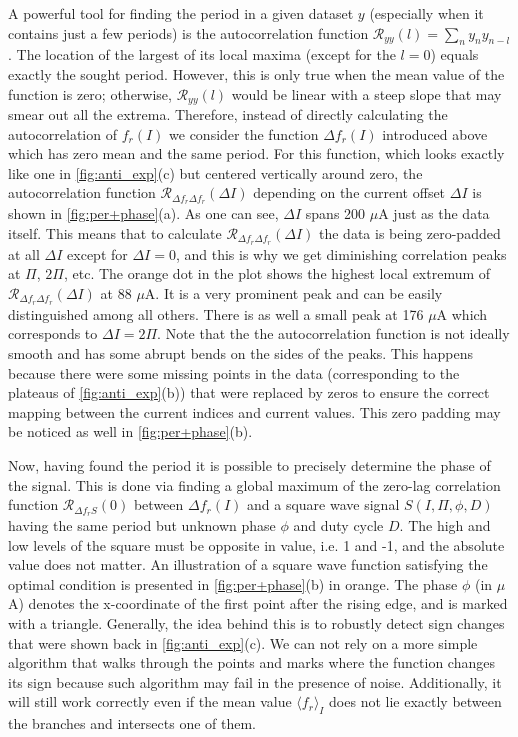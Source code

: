 \documentclass[%
 aip,
 draft,
 amsmath,amssymb,
 reprint,%
]{revtex4-1}
\begin{document}
A powerful tool for finding the period in a given dataset $y$ (especially when it contains just a few periods) is the autocorrelation function $\mathcal{R}_{y y}(l) = \sum_n y_n y_{n-l}$. The location of the largest of its local maxima (except for the $l=0$) equals exactly the sought period. However, this is only true when the mean value of the function is zero; otherwise, $\mathcal{R}_{y y}(l)$ would be linear with a steep slope that may smear out all the extrema. Therefore, instead of directly calculating the autocorrelation of $f_r (I)$ we consider the function $\Delta f_r (I)$ introduced above which has zero mean and the same period. For this function, which looks exactly like one in \autoref{fig:anti_exp}(c) but centered vertically around zero, the autocorrelation function $\mathcal{R}_{\Delta f_r \Delta f_r}(\Delta I)$ depending on the current offset $\Delta I$ is shown in \autoref{fig:per+phase}(a). As one can see, $\Delta I$ spans 200 $\mu$A just as the data itself. This means that to calculate $\mathcal{R}_{\Delta f_r \Delta f_r}(\Delta I)$ the data is being zero-padded at all $\Delta I$ except for $\Delta I = 0$, and this is why we get diminishing correlation peaks at $\Pi$, $2\Pi$, etc. The orange dot in the plot shows the highest local extremum of $\mathcal{R}_{\Delta f_r \Delta f_r}(\Delta I)$ at 88 $\mu$A. It is a very prominent peak and can be easily distinguished among all others. There is as well a small peak at 176 $\mu$A which corresponds to $\Delta I = 2\Pi$. Note that the the autocorrelation function is not ideally smooth and has some abrupt bends on the sides of the peaks. This happens because there were some missing points in the data (corresponding to the plateaus of \autoref{fig:anti_exp}(b)) that were replaced by zeros to ensure the correct mapping between the current indices and current values. This zero padding may be noticed as well in \autoref{fig:per+phase}(b).

Now, having found the period it is possible to precisely determine the phase of the signal. This is done via finding a global maximum of the zero-lag correlation function  $\mathcal{R}_{\Delta f_r S}(0)$ between $\Delta f_r(I)$ and a square wave signal $S(I, \Pi, \phi, D)$ having the same period but unknown phase $\phi$ and duty cycle $D$. The high and low levels of the square must be opposite in value, i.e. 1 and -1, and the absolute value does not matter.  An illustration of a square wave function satisfying the optimal condition is presented in \autoref{fig:per+phase}(b) in orange. The phase $\phi$ (in $\mu$A) denotes the x-coordinate of the first point after the rising edge, and is marked with a triangle. Generally, the idea behind this is to robustly detect sign changes that were shown back in \autoref{fig:anti_exp}(c). We can not rely on a more simple algorithm that walks through the points and marks where the function changes its sign because such algorithm may fail in the presence of noise. Additionally, it will still work correctly even if the mean value $\langle f_r \rangle_{I}$ does not lie exactly between the branches and intersects one of them.
\end{document}
